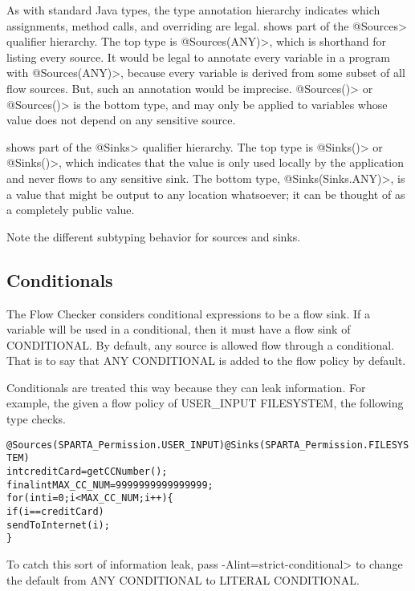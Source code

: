 As with standard Java types, the type annotation hierarchy indicates which
assignments, method calls, and overriding are legal.  
shows part of the \<@Sources>
qualifier hierarchy.  The top type is \<@Sources(ANY)>, which is
shorthand for listing every source.  It would be legal to annotate every
variable in a program with \<@Sources(ANY)>, because every variable is
derived from some subset of all flow sources.  But, such an annotation
would be imprecise.  \<@Sources(\ttcbs)> or \<@Sources()> is the
bottom type, and may only
be applied to variables whose value does not depend on any sensitive
source.


 shows part of the \<@Sinks>
qualifier hierarchy.  The top type is \<@Sinks(\ttcbs)> or
\<@Sinks()>, which indicates
that the value is only used locally by the application and never flows to
any sensitive sink.  The bottom type, \<@Sinks(Sinks.ANY)>, is a
value that might be output to any location whatsoever; it can be thought of
as a completely public value.

Note the different subtyping behavior for sources and sinks.




\subsection{Conditionals\label{sec:conditionals}}

The Flow Checker considers conditional expressions to be a flow sink.  If a variable 
will be used in a conditional, then it must have a flow sink of CONDITIONAL.  By default, 
any source is allowed flow through a conditional.  That is to say that 
ANY \flowsto{} CONDITIONAL is added to the flow policy by default. 

Conditionals are treated this way because they can leak information. For example, the given a flow policy of  USER\_INPUT \flowsto{} FILESYSTEM, the following type checks.

\begin{alltt}
@Sources(SPARTA_Permission.USER_INPUT) @Sinks(SPARTA_Permission.FILESYSTEM)
int creditCard = getCCNumber();
final int MAX\_CC\_NUM = 9999999999999999;
for (int i = 0 ; i < MAX\_CC\_NUM ; i++)\{
   if (i == creditCard)
        sendToInternet(i);
\}
\end{alltt}

To catch this sort of information leak, pass
 \<-Alint=strict-conditional> to change the default from ANY \flowsto{} CONDITIONAL to 
 LITERAL \flowsto{} CONDITIONAL. 



